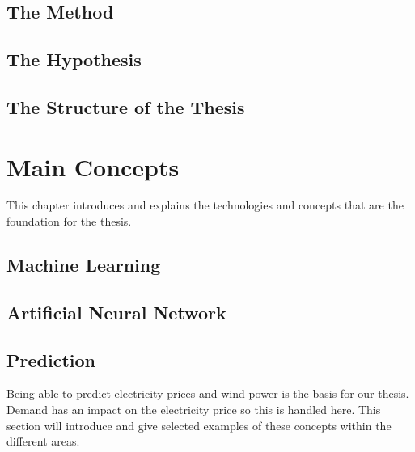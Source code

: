 \documentclass[twoside,11pt,openright]{report}
\begin{document}
\section{The Method}


\section{The Hypothesis}
\label{sec:theHypothesis}


\newpage
\section{The Structure of the Thesis}
\label{sec:structureOfTheThesis}



\chapter{Main Concepts}
This chapter introduces and explains the technologies and concepts that are the foundation for the thesis.
\label{ch:foundations}
\section{Machine Learning}
\label{sec:machineLearning}


\newpage
\section{Artificial Neural Network}
\label{sec:annSection}


\newpage
\section{Prediction}
\label{sec:predictionSection}
Being able to predict electricity prices and wind power is the basis for our thesis. Demand has an impact on the electricity price so this is handled here. This section will introduce and give selected examples of these concepts within the different areas. 
\end{document}
